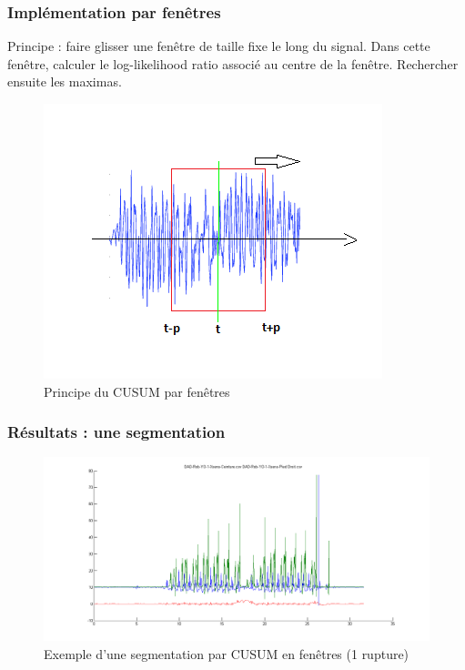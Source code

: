 \documentclass{beamer}
\begin{document}
\begin{frame}

\frametitle{Implémentation par fenêtres}
Principe : faire glisser une fenêtre de taille fixe le long du signal. Dans cette fenêtre, calculer le log-likelihood ratio associé au centre de la fenêtre. Rechercher ensuite les maximas.

\begin{figure}
	\includegraphics[scale=0.6]{diagramme_cusum_fen.png}
	\caption{Principe du CUSUM par fenêtres}
\end{figure}



\end{frame}

\begin{frame}
	\frametitle{Résultats : une segmentation}
	\begin{figure}
		\includegraphics[scale=0.3]{seg1_win.png}
		\caption{Exemple d'une segmentation par CUSUM en fenêtres (1 rupture)}
	\end{figure}
\end{frame}
\end{document}
